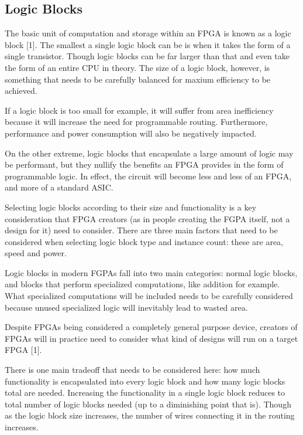\documentclass{article}
\begin{document}
    \subsection{Logic Blocks}

    The basic unit of computation and storage within an FPGA is known as a logic block [1].
    The smallest a single logic block can be is when it takes the form of a single transistor.
    Though logic blocks can be far larger than that and even take the form of an entire
    CPU in theory. The size of a logic block, however, is something that needs to be carefully
    balanced for maxium efficiency to be achieved.

    If a logic block is too small for example, it will suffer from area inefficiency because
    it will increase the need for programmable routing. Furthermore, performance and
    power consumption will also be negatively impacted.

    On the other extreme, logic blocks that encapsulate a large amount of logic may
    be performant, but they nullify the benefits an FPGA provides in the form of programmable
    logic. In effect, the circuit will become less and less of an FPGA, and more of
    a standard ASIC.

    Selecting logic blocks according to their size and functionality is a key consideration
    that FPGA creators (as in people creating the FGPA itself, not a design for it) need
    to consider. There are three main factors that need to be considered when selecting logic
    block type and instance count: these are area, speed and power.

    Logic blocks in modern FGPAs fall into two main categories: normal logic blocks,
    and blocks that perform specialized computations, like addition for example.
    What specialized computations will be included needs to be carefully considered
    because unused specialized logic will inevitably lead to wasted area.

    Despite FPGAs being considered a completely general purpose device,
    creators of FPGAs will in practice need to consider what kind of designs
    will run on a target FPGA [1].

    There is one main tradeoff that needs to be considered here:
    how much functionality is encapsulated into every logic block and how many
    logic blocks total are needed.
    Increasing the functionality in a single logic block reduces to total
    number of logic blocks needed (up to a diminishing point that is).
    Though as the logic block size increases, the number of wires connecting
    it in the routing increases.
\end{document}
